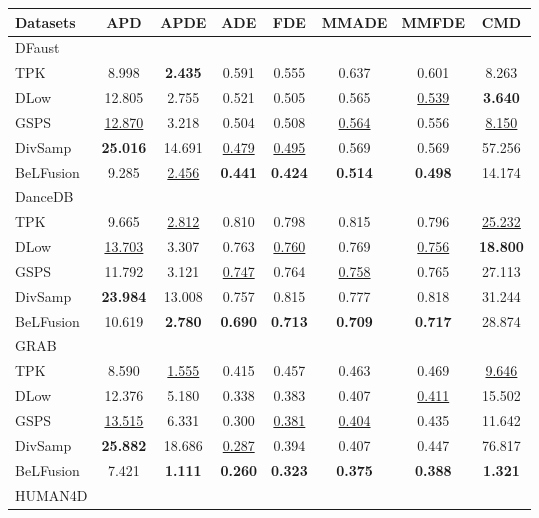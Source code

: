 \documentclass[10pt,twocolumn,letterpaper]{article}
\begin{document}
\setlength{\tabcolsep}{2pt}
\begin{table}[t!]\renewcommand{\arraystretch}{0.9}
\footnotesize		
\centering
\begin{tabular}{lccccccc@{\hskip 2mm}}
\toprule
Datasets & APD & APDE  & ADE  & FDE  & MMADE  & MMFDE & CMD\\
\midrule
DFaust \\
\midrule
TPK & 8.998 & \textbf{2.435} & 0.591 & 0.555 & 0.637 & 0.601 & 8.263\\
DLow & 12.805 & 2.755 & 0.521 & 0.505 & 0.565 & \underline{0.539} & \textbf{3.640}\\
GSPS & \underline{12.870} & 3.218 & 0.504 & 0.508 & \underline{0.564} & 0.556 & \underline{8.150}\\
DivSamp & \textbf{25.016} & 14.691 & \underline{0.479} & \underline{0.495} & 0.569 & 0.569 & 57.256\\
BeLFusion & 9.285 & \underline{2.456} & \textbf{0.441} & \textbf{0.424} & \textbf{0.514} & \textbf{0.498} & 14.174\\
\midrule
DanceDB \\
\midrule
TPK & 9.665 & \underline{2.812} & 0.810 & 0.798 & 0.815 & 0.796 & \underline{25.232}\\
DLow & \underline{13.703} & 3.307 & 0.763 & \underline{0.760} & 0.769 & \underline{0.756} & \textbf{18.800}\\
GSPS & 11.792 & 3.121 & \underline{0.747} & 0.764 & \underline{0.758} & 0.765 & 27.113\\
DivSamp & \textbf{23.984} & 13.008 & 0.757 & 0.815 & 0.777 & 0.818 & 31.244\\
BeLFusion & 10.619 & \textbf{2.780} & \textbf{0.690} & \textbf{0.713} & \textbf{0.709} & \textbf{0.717} & 28.874\\
\midrule
GRAB \\
\midrule
TPK & 8.590 & \underline{1.555} & 0.415 & 0.457 & 0.463 & 0.469 & \underline{9.646}\\
DLow & 12.376 & 5.180 & 0.338 & 0.383 & 0.407 & \underline{0.411} & 15.502\\
GSPS & \underline{13.515} & 6.331 & 0.300 & \underline{0.381} & \underline{0.404} & 0.435 & 11.642\\
DivSamp & \textbf{25.882} & 18.686 & \underline{0.287} & 0.394 & 0.407 & 0.447 & 76.817\\
BeLFusion & 7.421 & \textbf{1.111} & \textbf{0.260} & \textbf{0.323} & \textbf{0.375} & \textbf{0.388} & \textbf{1.321}\\
\midrule
HUMAN4D \\

\end{tabular}
\end{table}
\end{document}
